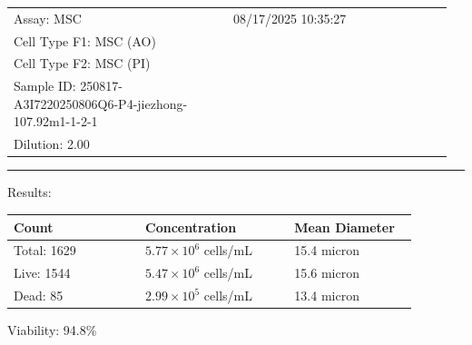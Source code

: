 \documentclass[UTF8,10pt,a4paper,fontset=fandol]{ctexart}
\newcommand{\fieldvalue}[1]{#1}
\begin{document}
\newpage

\noindent
\begin{tabular}{@{}p{0.48\linewidth}p{0.48\linewidth}@{}}
Assay:
\fieldvalue{MSC}
&
08/17/2025
\fieldvalue{10:35:27}
\\[1ex]
Cell Type F1:
\fieldvalue{MSC (AO)}
&
\\
Cell Type F2:
\fieldvalue{MSC (PI)}
&
\\[1ex]
Sample ID:
\fieldvalue{250817-A3I7220250806Q6-P4-jiezhong-107.92m1-1-2-1}
&
\\
Dilution:
\fieldvalue{2.00}
&
\end{tabular}

\vspace{1em}
\hrule
\vspace{1em}

\noindent Results:

\vspace{0.5em}
\noindent
\begin{tabular}{@{}p{0.30\linewidth}p{0.34\linewidth}p{0.28\linewidth}@{}}
\textbf{Count} & \textbf{Concentration} & \textbf{Mean Diameter} \\
\hline
Total:
\fieldvalue{1629}
&
\fieldvalue{$5.77\times10^{6}$ cells/mL}
&
\fieldvalue{15.4 micron}
\\
Live:
\fieldvalue{1544}
&
\fieldvalue{$5.47\times10^{6}$ cells/mL}
&
\fieldvalue{15.6 micron}
\\
Dead:
\fieldvalue{85}
&
\fieldvalue{$2.99\times10^{5}$ cells/mL}
&
\fieldvalue{13.4 micron}
\end{tabular}

\vspace{1em}
Viability:
\fieldvalue{94.8\%}
\end{document}
